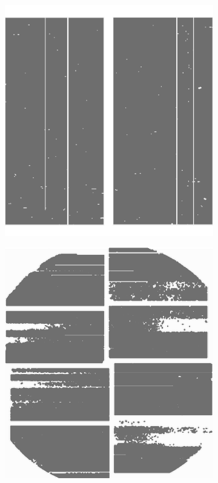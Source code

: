 \begin{figure}
	\centering
	\begin{subfigure}{0.3\textwidth}
		\includegraphics[width=\linewidth]{images/mask_dual.png}
	\end{subfigure}
	\hspace{1cm}
	\begin{subfigure}{0.3\textwidth}
		\includegraphics[width=\linewidth]{images/mask_octal.png}

\end{subfigure}
\end{figure}
